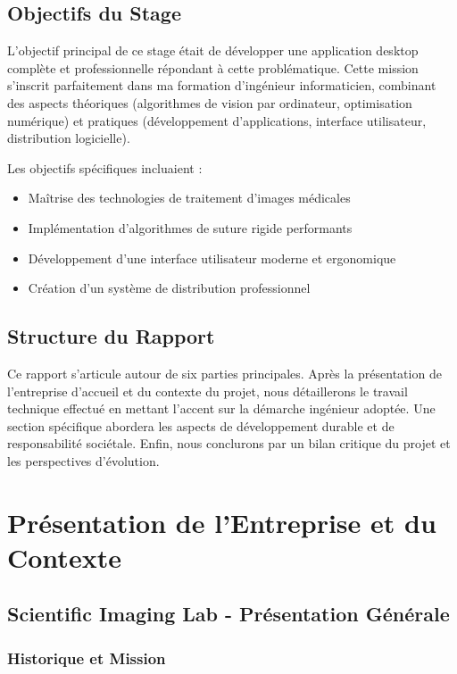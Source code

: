 \documentclass[12pt,a4paper]{report}
\begin{document}
\section{Objectifs du Stage}

L'objectif principal de ce stage était de développer une application desktop complète et professionnelle répondant à cette problématique. Cette mission s'inscrit parfaitement dans ma formation d'ingénieur informaticien, combinant des aspects théoriques (algorithmes de vision par ordinateur, optimisation numérique) et pratiques (développement d'applications, interface utilisateur, distribution logicielle).

Les objectifs spécifiques incluaient :
\begin{itemize}
\item Maîtrise des technologies de traitement d'images médicales
\item Implémentation d'algorithmes de suture rigide performants
\item Développement d'une interface utilisateur moderne et ergonomique
\item Création d'un système de distribution professionnel
\end{itemize}

\section{Structure du Rapport}

Ce rapport s'articule autour de six parties principales. Après la présentation de l'entreprise d'accueil et du contexte du projet, nous détaillerons le travail technique effectué en mettant l'accent sur la démarche ingénieur adoptée. Une section spécifique abordera les aspects de développement durable et de responsabilité sociétale. Enfin, nous conclurons par un bilan critique du projet et les perspectives d'évolution.

\chapter{Présentation de l'Entreprise et du Contexte}

\section{Scientific Imaging Lab - Présentation Générale}

\subsection{Historique et Mission}
\end{document}
